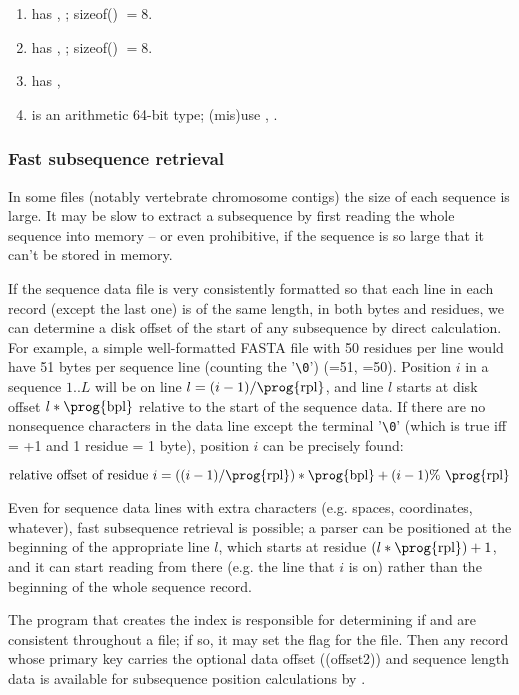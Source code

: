 \documentclass[12pt]{report}
\begin{document}
\begin{enumerate}
\item has , ; sizeof() $= 8$.
\item has , ; sizeof() $= 8$.
\item has , 
\item {} is an arithmetic 64-bit type; (mis)use
, .
\end{enumerate}



\subsubsection{Fast subsequence retrieval}

In some files (notably vertebrate chromosome contigs) the size of each
sequence is large. It may be slow to extract a subsequence by first
reading the whole sequence into memory -- or even prohibitive, if the
sequence is so large that it can't be stored in memory.

If the sequence data file is very consistently formatted so that each
line in each record (except the last one) is of the same length, in
both bytes and residues, we can determine a disk offset of the start
of any subsequence by direct calculation.
For example, a simple well-formatted FASTA
file with 50 residues per line would have 51 bytes per sequence line
(counting the '\verb+\0+') (=51, =50). Position $i$ in a sequence
$1..L$ will be on line $l = (i-1)/\mbox{\prog{rpl}}$, and line $l$ starts at
disk offset $l * \mbox{\prog{bpl}}$ relative to the start of the sequence
data. If there are no nonsequence characters in the data line except
the terminal '\verb+\0+' (which is true iff  = +1 and 1 residue = 1
byte), position $i$ can be precisely found:

\[
\mbox{relative offset of residue $i$} =
\left((i-1)/\mbox{\prog{rpl}}\right)*\mbox{\prog{bpl}} + (i-1) \% \mbox{ \prog{rpl}}
\]

Even for sequence data lines with extra characters (e.g. spaces,
coordinates, whatever), fast subsequence retrieval is possible; a
parser can be positioned at the beginning of the appropriate line $l$,
which starts at residue $(l*\mbox{\prog{rpl}}) + 1$, and it can start reading
from there (e.g. the line that $i$ is on) rather than the beginning of
the whole sequence record.

The program that creates the index is responsible for determining if
 and  are consistent throughout a file; if so, it
may set the  flag for the file. Then any record
whose primary key carries the optional data offset (\prog(offset2))
and sequence length data is available for subsequence position
calculations by . 
\end{document}
